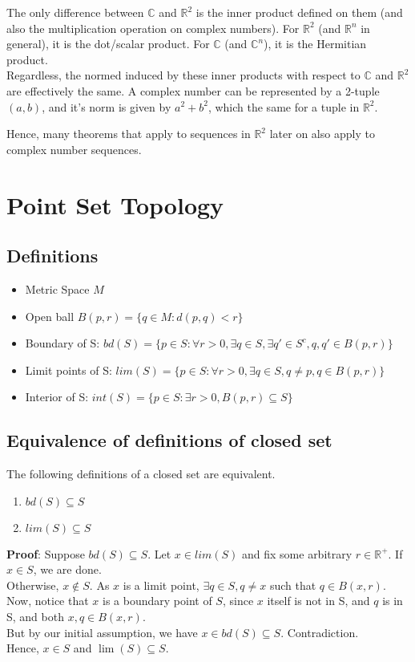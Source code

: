 \documentclass{article}
\begin{document}
The only difference between $\mathbb{C}$ and $\mathbb{R}^2$ is the inner product defined on them (and also the multiplication operation on complex numbers). For $\mathbb{R}^2$ (and $\mathbb{R}^n$ in general), it is the dot/scalar product. For $\mathbb{C}$ (and $\mathbb{C}^n$), it is the Hermitian product. \\
Regardless, the normed induced by these inner products with respect to $\mathbb{C}$ and $\mathbb{R}^2$ are effectively the same.
A complex number can be represented by a 2-tuple $(a,b)$, and it's norm is given by $a^2+b^2$, which the same for a tuple in $\mathbb{R}^2$.

Hence, many theorems that apply to sequences in $\mathbb{R}^2$ later on also apply to complex number sequences.


\section{Point Set Topology}
\subsection{Definitions}
\begin{itemize}
	\item Metric Space $M$
	\item Open ball $B(p,r)=\{q\in M : d(p,q) < r \}$
	\item Boundary of S: $bd(S)=\{p\in S : \forall r > 0, \exists q\in S, \exists q'\in S^c, q,q'\in B(p,r) \}$
	\item Limit points of S: $lim(S)=\{p\in S : \forall r > 0, \exists q\in S, q\neq p, q\in B(p,r) \}$
	\item Interior of S: $int(S)=\{p\in S : \exists r > 0, B(p,r)\subseteq S\}$
\end{itemize}
\subsection{Equivalence of definitions of closed set}
The following definitions of a closed set are equivalent.

\begin{enumerate}
	\item $bd(S)\subseteq S$
	\item $lim(S)\subseteq S$
\end{enumerate}

\textbf{Proof}: Suppose $bd(S)\subseteq S$. 
Let $x\in lim(S)$ and fix some arbitrary $r\in \mathbb{R}^+$.
If $x\in S$, we are done.\\
Otherwise,  $x\not \in S$. As $x$ is a limit point, $\exists q\in S, q\neq x$ such that $q\in B(x,r)$. Now, notice that $x$ is a boundary point of $S$, since $x$ itself is not in S, and $q$ is in S, and both $x,q\in B(x,r)$.\\
But by our initial assumption, we have $x\in bd(S)\subseteq S$. Contradiction.\\
Hence, $x\in S$ and $\lim(S)\subseteq S$.
\end{document}
